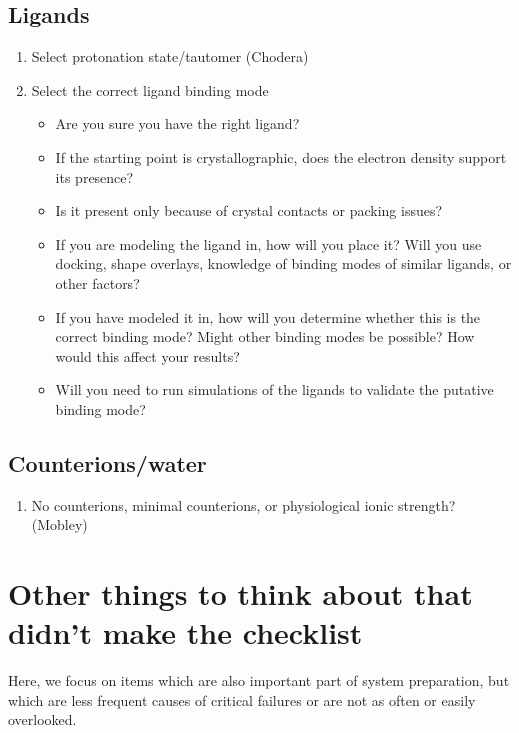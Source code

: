 \documentclass[9pt,bestpractices]{livecoms}
\begin{document}
\subsection{Ligands}

\begin{enumerate}
\item Select protonation state/tautomer (Chodera)
\item Select the correct ligand binding mode %
    \begin{itemize}
    \item Are you sure you have the right ligand?
    \item If the starting point is crystallographic, does the electron density support its presence? 
    \item Is it present only because of crystal contacts or packing issues?
    \item If you are modeling the ligand in, how will you place it? %
Will you use docking, shape overlays, knowledge of binding modes of similar ligands, or other factors?
    \item If you have modeled it in, how will you determine whether this is the correct binding mode? Might other binding modes be possible? How would this affect your results?
    \item Will you need to run simulations of the ligands to validate the putative binding mode?
    \end{itemize}
\end{enumerate}

\subsection{Counterions/water}

\begin{enumerate}
\item No counterions, minimal counterions, or physiological ionic strength? (Mobley)

\end{enumerate}

\section{Other things to think about that didn't make the checklist}

Here, we focus on items which are also important part of system preparation, but which are less frequent causes of critical failures or are not as often or easily overlooked.
\end{document}
